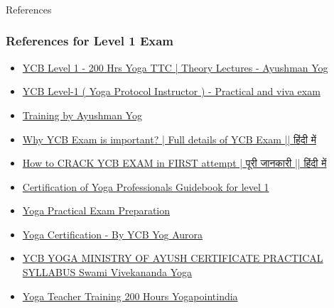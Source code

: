 \begin{frame}[fragile]\frametitle{}
\begin{center}
{\Large References}
\end{center}
\end{frame}

\begin{frame}[fragile]\frametitle{References for Level 1 Exam}

    \begin{itemize}
        \item \href{https://www.youtube.com/playlist?list=PL3EqlKH94cs4R6dM7IObWxxVERMVq6ujb}{YCB Level 1 - 200 Hrs Yoga TTC | Theory Lectures - Ayushman Yog}
        \item \href{https://www.youtube.com/watch?v=hIn-4tIbqzY}{YCB Level-1 ( Yoga Protocol Instructor ) - Practical and viva exam}
        \item \href{https://www.ayushmanyog.com/}{Training by Ayushman Yog}
        \item \href{https://www.youtube.com/watch?v=dcgclaWQlBE}{Why YCB Exam is important? | Full details of YCB Exam || हिंदी में}
        \item \href{https://www.youtube.com/watch?v=uJmlKFNzqTw}{How to CRACK YCB EXAM in FIRST attempt | पूरी जानकारी || हिंदी में}
        \item \href{https://www.amazon.in/Certification-Yoga-Professionals-Guidebook-level/dp/8183231837}{Certification of Yoga Professionals Guidebook for level 1}
        \item \href{https://www.youtube.com/watch?v=pEnj0LDEQ-o}{Yoga Practical Exam Preparation}
        \item \href{https://www.youtube.com/playlist?list=PLCCm_6ZMItDNbits0GVY2sTDmPZ8lzlt0}{Yoga Certification - By YCB Yog Aurora}
        \item \href{https://www.youtube.com/playlist?list=PLwTNiWTjM67Pvxx8and-2rbosuXmmI1MK}{YCB YOGA MINISTRY OF AYUSH CERTIFICATE PRACTICAL SYLLABUS Swami Vivekananda Yoga}
        \item \href{https://www.youtube.com/playlist?list=PLHDygCsgSb2sIXFisA-jVjPyBfn_V22k9}{Yoga Teacher Training 200 Hours Yogapointindia}
    \end{itemize}

\end{frame}